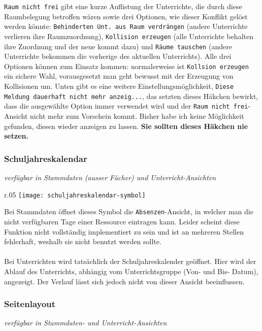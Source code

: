 \noindent
\texttt{Raum nicht frei} gibt eine kurze Auflistung der Unterrichte, die durch diese Raumbelegung betroffen wären sowie drei Optionen, wie dieser Konflikt gelöst werden könnte: \texttt{Behinderten Unt. aus Raum verdrängen} (andere Unterrichte verlieren ihre Raumzuordnung), \texttt{Kollision erzeugen} (alle Unterrichte behalten ihre Zuordnung und der neue kommt dazu) und \texttt{Räume tauschen} (andere Unterrichte bekommen die vorherige des aktuellen Unterrichts). Alle drei Optionen können zum Einsatz kommen: normalerweise ist \texttt{Kollsion erzeugen} ein sichere Wahl, vorausgesetzt man geht bewusst mit der Erzeugung von Kollisionen um. Unten gibt es eine weitere Einstellungsmöglichkeit, \texttt{Diese Meldung dauerhaft nicht mehr anzeig...}, das setzten dieses Häkchen bewirkt, dass die ausgewählte Option immer verwendet wird und der \texttt{Raum nicht frei}-Ansicht nicht mehr zum Vorschein kommt. Bisher habe ich keine Möglichkeit gefunden, diesen wieder anzeigen zu lassen. \textbf{Sie sollten dieses Häkchen nie setzen.}\\

\subsubsection{Schuljahreskalendar}
{\small\textit{verfügbar in Stammdaten (ausser Fächer) und Unterricht-Ansichten\\}\par}

\begin{wrapfigure}{r}{.05\textwidth}
	\vspace{-50pt}
	\texttt{[image: schuljahreskalendar-symbol]}
	\vspace{-35pt}
\end{wrapfigure}

\noindent
Bei Stammdaten öffnet dieses Symbol die \texttt{Absenzen}-Ansicht, in welcher man die nicht verfügbaren Tage einer Ressource eintragen kann. Leider scheint diese Funktion nicht vollständig implementiert zu sein und ist an mehreren Stellen fehlerhaft, weshalb sie nicht benutzt werden sollte.\\
\\
Bei Unterrichten wird tatsächlich der Schuljahreskalender geöffnet. Hier wird der Ablauf des Unterrichts, abhängig vom Unterrichtsgruppe (Von- und Bis- Datum), angezeigt. Der Verlauf lässt sich jedoch nicht von dieser Ansicht beeinflussen.\\

\subsubsection{Seitenlayout}
{\small\textit{verfügbar in Stammdaten- und Unterricht-Ansichten\\}\par}

